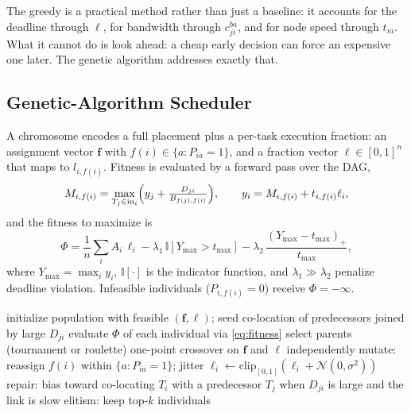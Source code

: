 \documentclass[conference]{IEEEtran}
\begin{document}
The greedy is a practical method rather than just a baseline: it accounts for the deadline through $\ell$, for bandwidth through $c_{ji}^{ba}$, and for node speed through $t_{ia}$. What it cannot do is look ahead: a cheap early decision can force an expensive one later. The genetic algorithm addresses exactly that.

\subsection{Genetic-Algorithm Scheduler}
\label{sec:ga}

A chromosome encodes a full placement plus a per-task execution fraction: an assignment vector $\mathbf{f}$ with $f(i)\in\{a:P_{ia}=1\}$, and a fraction vector $\boldsymbol{\ell}\in[0,1]^n$ that maps to $l_{i,f(i)}$. Fitness is evaluated by a forward pass over the DAG,
\begin{equation}
M_{i,f(i)}=\max_{T_j\in \mathrm{in}_i}\Bigl(y_j+\tfrac{D_{ji}}{B_{f(j),f(i)}}\Bigr),\qquad
y_i=M_{i,f(i)}+t_{i,f(i)}\ell_i,
\end{equation}
and the fitness to maximize is
\begin{equation}
\Phi=\frac{1}{n}\sum_i A_i\,\ell_i
-\lambda_1\,\mathbb{I}[Y_{\max}>t_{\max}]
-\lambda_2\,\frac{(Y_{\max}-t_{\max})_+}{t_{\max}},
\label{eq:fitness}
\end{equation}
where $Y_{\max}=\max_i y_i$, $\mathbb{I}[\cdot]$ is the indicator function, and $\lambda_1\gg\lambda_2$ penalize deadline violation. Infeasible individuals ($P_{i,f(i)}=0$) receive $\Phi=-\infty$.

\begin{algorithm}[t]
\caption{Genetic Algorithm for Bandwidth/Data-Aware Fog Scheduling}
\label{alg:ga}
\begin{algorithmic}[1]
\STATE initialize population with feasible $(\mathbf{f},\boldsymbol{\ell})$; seed co-location of predecessors joined by large $D_{ji}$
\REPEAT
    \STATE evaluate $\Phi$ of each individual via \eqref{eq:fitness}
    \STATE select parents (tournament or roulette)
    \STATE one-point crossover on $\mathbf{f}$ and $\boldsymbol{\ell}$ independently
    \STATE mutate: reassign $f(i)$ within $\{a:P_{ia}=1\}$; jitter $\ell_i\leftarrow\mathrm{clip}_{[0,1]}(\ell_i+\mathcal{N}(0,\sigma^2))$
    \STATE repair: bias toward co-locating $T_i$ with a predecessor $T_j$ when $D_{ji}$ is large and the link is slow
    \STATE elitism: keep top-$k$ individuals
\end{algorithmic}
\end{algorithm}
\end{document}
